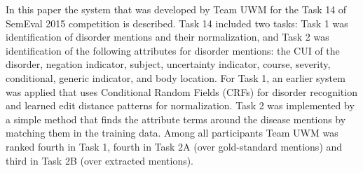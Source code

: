 In this paper the system that was developed by Team UWM for the Task 14 of SemEval 2015 competition is described. Task 14 included two tasks: Task 1 was identification of disorder mentions and their normalization, and Task 2 was identification of the following attributes for                    disorder mentions: the CUI of the disorder, negation indicator, subject, uncertainty indicator, course, severity, conditional, generic indicator, and body location. For Task 1, an earlier system was applied that uses Conditional Random Fields (CRFs) for disorder recognition and learned edit distance patterns for normalization. Task 2 was implemented by a simple method that finds the attribute terms around the disease mentions by matching them in the training data. Among all participants Team UWM was ranked fourth in Task 1, fourth in Task 2A (over gold-standard mentions) and third in Task 2B (over extracted mentions).
